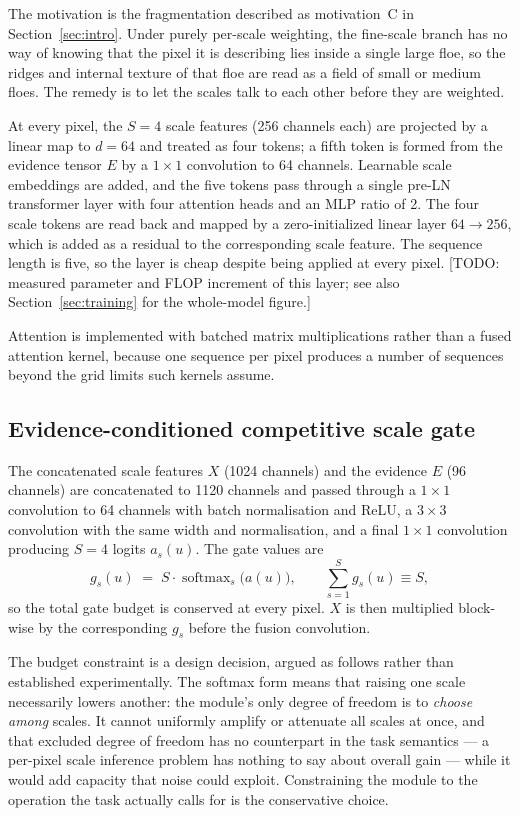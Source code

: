 \documentclass[preprint,12pt,authoryear]{elsarticle}
\begin{document}
The motivation is the fragmentation described as motivation~C in
Section~\ref{sec:intro}. Under purely per-scale weighting, the fine-scale branch
has no way of knowing that the pixel it is describing lies inside a single large
floe, so the ridges and internal texture of that floe are read as a field of
small or medium floes. The remedy is to let the scales talk to each other before
they are weighted.

At every pixel, the $S=4$ scale features (256 channels each) are projected by a
linear map to $d=64$ and treated as four tokens; a fifth token is formed from
the evidence tensor $E$ by a $1\times1$ convolution to 64 channels. Learnable
scale embeddings are added, and the five tokens pass through a single pre-LN
transformer layer with four attention heads and an MLP ratio of 2. The four
scale tokens are read back and mapped by a zero-initialized linear layer
$64 \to 256$, which is added as a residual to the corresponding scale feature.
The sequence length is five, so the layer is cheap despite being applied at
every pixel. [TODO: measured parameter and FLOP increment of this layer; see
also Section~\ref{sec:training} for the whole-model figure.]

Attention is implemented with batched matrix multiplications rather than a fused
attention kernel, because one sequence per pixel produces a number of sequences
beyond the grid limits such kernels assume.

\subsection{Evidence-conditioned competitive scale gate}
\label{sec:gate}

The concatenated scale features $X$ (1024 channels) and the evidence $E$ (96
channels) are concatenated to 1120 channels and passed through a $1\times1$
convolution to 64 channels with batch normalisation and ReLU, a $3\times3$
convolution with the same width and normalisation, and a final $1\times1$
convolution producing $S=4$ logits $a_s(u)$. The gate values are
\begin{equation}
g_s(u) \;=\; S \cdot \operatorname{softmax}_s\bigl(a(u)\bigr),
\qquad \sum_{s=1}^{S} g_s(u) \equiv S ,
\label{eq:gate}
\end{equation}
so the total gate budget is conserved at every pixel. $X$ is then multiplied
block-wise by the corresponding $g_s$ before the fusion convolution.

The budget constraint is a design decision, argued as follows rather than
established experimentally. The softmax form means that raising one scale
necessarily lowers another: the module's only degree of freedom is to
\emph{choose among} scales. It cannot uniformly amplify or attenuate all scales
at once, and that excluded degree of freedom has no counterpart in the task
semantics --- a per-pixel scale inference problem has nothing to say about
overall gain --- while it would add capacity that noise could exploit.
Constraining the module to the operation the task actually calls for is the
conservative choice.
\end{document}
